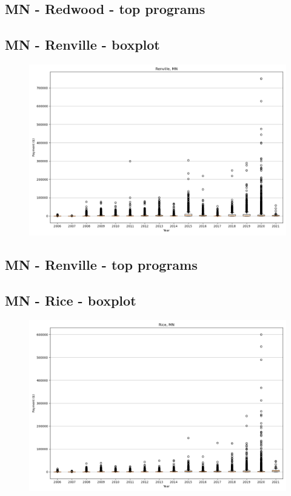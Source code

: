 \subsection*{MN - Redwood - top programs}

\newpage
\subsection*{MN - Renville - boxplot}
\begin{figure}[h]
\centering
\includegraphics[width=7in]{../output/boxplots/counties/Renville-MN_boxplot.png}
\end{figure}


\subsection*{MN - Renville - top programs}

\newpage
\subsection*{MN - Rice - boxplot}
\begin{figure}[h]
\centering
\includegraphics[width=7in]{../output/boxplots/counties/Rice-MN_boxplot.png}
\end{figure}


